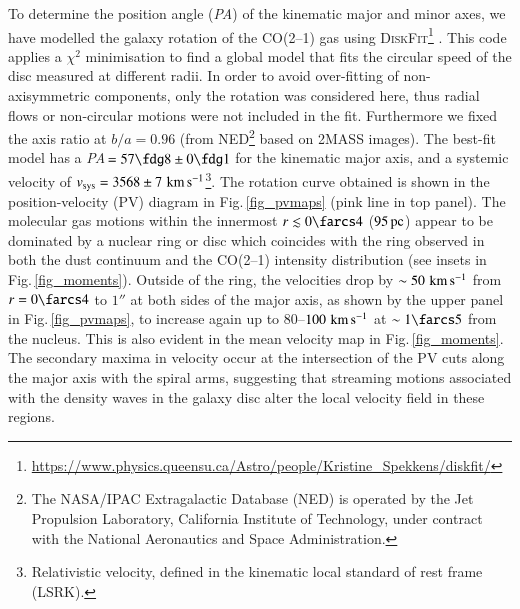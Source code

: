\documentclass[longauth]{aa}
\newcommand{\kms}{\,\hbox{\hbox{km}\,\hbox{s}$^{-1}$}}
\begin{document}
To determine the position angle (\textit{PA}) of the kinematic major and minor axes, we have modelled the galaxy rotation of the CO(2--1) gas using \textsc{DiskFit}\footnote{\url{https://www.physics.queensu.ca/Astro/people/Kristine_Spekkens/diskfit/}} . This code applies a $\chi^2$ minimisation to find a global model that fits the circular speed of the disc measured at different radii. In order to avoid over-fitting of non-axisymmetric components, only the rotation was considered here, thus radial flows or non-circular motions were not included in the fit. Furthermore we fixed the axis ratio at $b/a = 0.96$ (from NED\footnote{The NASA/IPAC Extragalactic Database (NED) is operated by the Jet Propulsion Laboratory, California Institute of Technology, under contract with the National Aeronautics and Space Administration.} based on 2MASS images). The best-fit model has a \textit{PA}\,$= 57\fdg8 \pm 0\fdg1$ for the kinematic major axis, and a systemic velocity of $v_{\rm sys} = 3568 \pm 7\, \rm{\kms}$\footnote{Relativistic velocity, defined in the kinematic local standard of rest frame (LSRK).}. The rotation curve obtained is shown in the position-velocity (PV) diagram in Fig.\,\ref{fig_pvmaps} (pink line in top panel). The molecular gas motions within the innermost $r \lesssim 0\farcs4$ ($95\, \rm{pc}$) appear to be dominated by a nuclear ring or disc which coincides with the ring observed in both the dust continuum and the CO(2--1) intensity distribution (see insets in Fig.\,\ref{fig_moments}). Outside of the ring, the velocities drop by $\sim 50\, \rm{\kms}$ from $r = 0\farcs4$ to $1''$ at both sides of the major axis, as shown by the upper panel in Fig.\,\ref{fig_pvmaps}, to increase again up to $80$--$100\, \rm{\kms}$ at $\sim 1\farcs5$ from the nucleus. This is also evident in the mean velocity map in Fig.\,\ref{fig_moments}. The secondary maxima in velocity occur at the intersection of the PV cuts along the major axis with the spiral arms, suggesting that streaming motions associated with the density waves in the galaxy disc alter the local velocity field in these regions.
\end{document}

